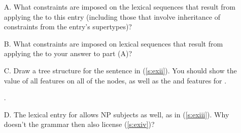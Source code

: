 \documentclass[a4paper,landscape,headrule,footrule,dvips]{foils}
\begin{document}
\newpage
\begin{itemize}
\item[A.] What constraints are imposed on the lexical sequences that
  result from applying the  to
  this entry (including those that involve inheritance of constraints
  from the entry's supertypes)?

\item[B.] What constraints are imposed on lexical sequences that
  result from applying the  to your
  answer to part (A)?

\item[C.] Draw a tree structure for the sentence in (\ref{s:exii}).
  You should show the value of all  features on all of the nodes,
  as well as the  and  features for .

\begin{exe}
  \ex\label{s:exii} .
\end{exe}
\newpage
\item[D.] The lexical entry for  allows NP subjects as
  well, as in (\ref{s:exiii}).  Why doesn't the grammar then also
  license (\ref{s:exiv})?

\begin{exe}
\ex\label{s:exiii} 

\ex\label{s:exiv} \bad {}
\end{exe}
\end{itemize}
\end{document}
